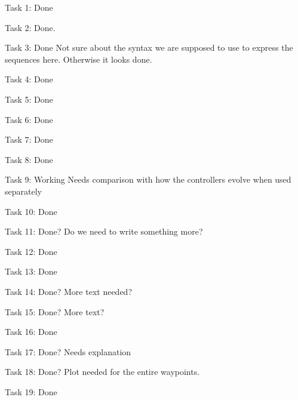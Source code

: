 Task 1: Done

Task 2: Done.

Task 3: Done
Not sure about the syntax we are supposed to use to express the sequences here. Otherwise it looks done.

Task 4: Done

Task 5: Done

Task 6: Done

Task 7: Done

Task 8: Done

Task 9: Working
Needs comparison with how the controllers evolve when used separately

Task 10: Done

Task 11: Done? 
Do we need to write something more?

Task 12: Done

Task 13: Done

Task 14: Done?
More text needed?

Task 15: Done?
More text?

Task 16: Done

Task 17: Done?
Needs explanation

Task 18: Done?
Plot needed for the entire waypoints. 

Task 19: Done